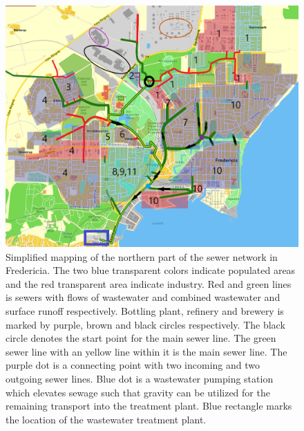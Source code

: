 \begin{figure}[H]
\centering
\includegraphics[width=1\textwidth]{report/system_overview/pictures/kloakgrid_simplified9.png}
\caption{Simplified mapping of the northern part of the sewer network in Fredericia. The two blue transparent colors indicate populated areas and the red transparent area indicate industry. Red and green lines is sewers with flows of wastewater and combined wastewater and surface runoff  respectively. Bottling plant, refinery and brewery is marked by purple, brown and black circles respectively. The black circle denotes the start point for the main sewer line. The green sewer line with an yellow line within it is the main sewer line. The purple dot is a connecting point with two incoming and two outgoing sewer lines. Blue dot is a wastewater pumping station which elevates sewage such that gravity can be utilized for the remaining transport into the treatment plant. Blue rectangle marks the location of the wastewater treatment plant.
\cite{Krak} \cite{GIS_kort}}
\label{fig:kloakgrid_simplified}
\end{figure}


